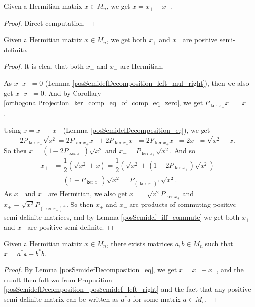  \begin{lemma}\label{posSemidefDecomposition_eq}
  \leanok
  Given a Hermitian matrix $x\in M_n$, we get $x=x_+-x_-$.
 \end{lemma}
 \begin{proof}\leanok
  Direct computation.
 \end{proof}
 
 \begin{proposition}\label{posSemidefDecomposition_posSemidef_left_right}
  \leanok
  Given a Hermitian matrix $x\in M_n$, we get both $x_+$ and $x_-$ are positive semi-definite.
 \end{proposition}
 \begin{proof}
  \leanok
  It is clear that both $x_+$ and $x_-$ are Hermitian.
  
  As $x_+x_-=0$ (Lemma \ref{posSemidefDecomposition_left_mul_right}), then we also get $x_-x_+=0$. And by Corollary \ref{orthogonalProjection_ker_comp_eq_of_comp_eq_zero}, we get $P_{\ker{x_+}}x_-=x_-$.
 
  Using $x=x_+-x_-$ (Lemma \ref{posSemidefDecomposition_eq}),
  we get \[2P_{\ker{x_+}}\sqrt{x^2}=2P_{\ker{x_+}}x_++2P_{\ker{x_+}}x_-=2P_{\ker{x_+}}x_-=2x_-=\sqrt{x^2}-x.\]
  So then $x=(1-2P_{\ker{x_+}})\sqrt{x^2}$ and $x_-=P_{\ker{x_+}}\sqrt{x^2}$. And so
  \begin{align*}
    x_+ &= \dfrac{1}{2}(\sqrt{x^2}+x)=\dfrac{1}{2}(\sqrt{x^2}+(1-2P_{\ker{x_+}})\sqrt{x^2})\\
    &= (1-P_{\ker{x_+}})\sqrt{x^2}=P_{{(\ker{x_+})}^\bot}\sqrt{x^2}.
  \end{align*}
  As $x_+$ and $x_-$ are Hermitian, we also get $x_-=\sqrt{x^2}P_{\ker{x_+}}$ and $x_+=\sqrt{x^2}P_{{(\ker{x_+})}^\bot}$. So then $x_+$ and $x_-$ are products of commuting positive semi-definite matrices, and by Lemma \ref{posSemidef_iff_commute} we get both $x_+$ and $x_-$ are positive semi-definite.
 \end{proof}

 \begin{corollary}\label{posSemidefDecomposition'}
  \leanok
  Given a Hermitian matrix $x\in M_n$, there exists matrices $a,b\in M_n$ such that $x = a^*a - b^*b$.
 \end{corollary}
 \begin{proof}
  \leanok
  By Lemma \ref{posSemidefDecomposition_eq}, we get $x=x_+-x_-$, and the result then follows from Proposition \ref{posSemidefDecomposition_posSemidef_left_right} and the fact that any positive semi-definite matrix can be written as $a^*a$ for some matrix $a\in M_n$.
 \end{proof}

